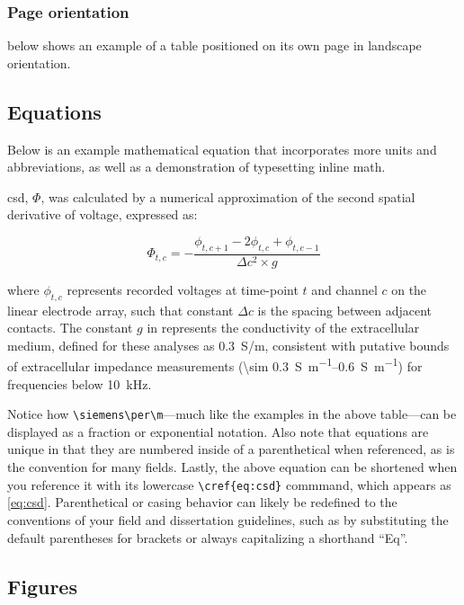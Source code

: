 \documentclass[../../main.tex]{subfiles}  %
\begin{document}
	\subsubsection{Page orientation}

	 below shows an example of a table positioned on its own page in landscape orientation.
	
	
	
	\subsection{Equations}

	Below is an example mathematical equation that incorporates more units and abbreviations, as well as a demonstration of typesetting inline math.

	\Acrfull{csd}, $\Phi$, was calculated by a numerical approximation of the second spatial derivative of voltage, expressed as:

	\begin{equation}\label{eq:csd}
		\Phi_{t, c} = -\frac{\phi_{t, c+1} - 2\phi_{t, c} + \phi_{t, c-1}}{\Delta c^2 \times g}
	\end{equation}

	where $\phi_{t, c}$ represents recorded voltages at time-point $t$ and channel $c$ on the linear electrode array, such that constant $\Delta c$ is the spacing between adjacent contacts. 
	The constant $g$ in  represents the conductivity of the extracellular medium, defined for these analyses as \SI[per-mode=fraction]{0.3}{\siemens/\m}, consistent with putative bounds of extracellular impedance measurements (\qtyrange[range-units=single,range-phrase=-]{\sim 0.3}{0.6}{\siemens\per\m}) for frequencies below \SI{10}{\kHz}. 
	
	Notice how \verb|\siemens\per\m|---much like the examples in the above table---can be displayed as a fraction or exponential notation. 
	Also note that equations are unique in that they are numbered inside of a parenthetical when referenced, as is the convention for many fields. 
	Lastly, the above equation can be shortened when you reference it with its lowercase \verb|\cref{eq:csd}| commmand, which appears as \cref{eq:csd}. 
	Parenthetical or casing behavior can likely be redefined to the conventions of your field and dissertation guidelines, such as by substituting the default parentheses for brackets or always capitalizing a shorthand ``Eq''.
	

	\subsection{Figures}
\end{document}
